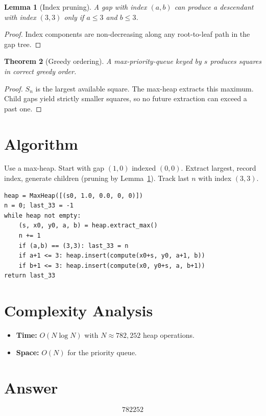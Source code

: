 \documentclass[12pt]{article}
\newtheorem{theorem}{Theorem}
\newtheorem{lemma}[theorem]{Lemma}
\begin{document}
\begin{lemma}[Index pruning]\label{lem:prune}
A gap with index $(a,b)$ can produce a descendant with index $(3,3)$ only if $a\le 3$ and $b\le 3$.
\end{lemma}

\begin{proof}
Index components are non-decreasing along any root-to-leaf path in the gap tree.
\end{proof}

\begin{theorem}[Greedy ordering]\label{thm:greedy}
A max-priority-queue keyed by $s$ produces squares in correct greedy order.
\end{theorem}

\begin{proof}
$S_n$ is the largest available square. The max-heap extracts this maximum. Child gaps yield strictly smaller squares, so no future extraction can exceed a past one.
\end{proof}

\section{Algorithm}

Use a max-heap. Start with gap $(1,0)$ indexed $(0,0)$. Extract largest, record index, generate children (pruning by Lemma~\ref{lem:prune}). Track last $n$ with index $(3,3)$.

\begin{verbatim}
heap = MaxHeap([(s0, 1.0, 0.0, 0, 0)])
n = 0; last_33 = -1
while heap not empty:
    (s, x0, y0, a, b) = heap.extract_max()
    n += 1
    if (a,b) == (3,3): last_33 = n
    if a+1 <= 3: heap.insert(compute(x0+s, y0, a+1, b))
    if b+1 <= 3: heap.insert(compute(x0, y0+s, a, b+1))
return last_33
\end{verbatim}

\section{Complexity Analysis}

\begin{itemize}
\item \textbf{Time:} $O(N\log N)$ with $N\approx 782{,}252$ heap operations.
\item \textbf{Space:} $O(N)$ for the priority queue.
\end{itemize}

\section{Answer}

\[
\boxed{782252}
\]
\end{document}
